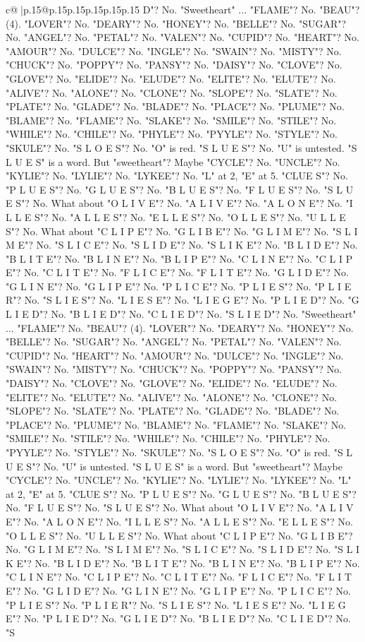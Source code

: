 \documentclass{article}
\begin{document}
{\begin{supertabular}{c@{$\;$}|p{.15\linewidth}@{}p{.15\linewidth}p{.15\linewidth}p{.15\linewidth}p{.15\linewidth}p{.15\linewidth}}
{{{D"? No. "Sweetheart" ... "FLAME"? No. "BEAU"? (4). "LOVER"? No. "DEARY"? No. "HONEY"? No. "BELLE"? No. "SUGAR"? No. "ANGEL"? No. "PETAL"? No. "VALEN"? No. "CUPID"? No. "HEART"? No. "AMOUR"? No. "DULCE"? No. "INGLE"? No. "SWAIN"? No. "MISTY"? No. "CHUCK"? No. "POPPY"? No. "PANSY"? No. "DAISY"? No. "CLOVE"? No. "GLOVE"? No. "ELIDE"? No. "ELUDE"? No. "ELITE"? No. "ELUTE"? No. "ALIVE"? No. "ALONE"? No. "CLONE"? No. "SLOPE"? No. "SLATE"? No. "PLATE"? No. "GLADE"? No. "BLADE"? No. "PLACE"? No. "PLUME"? No. "BLAME"? No. "FLAME"? No. "SLAKE"? No. "SMILE"? No. "STILE"? No. "WHILE"? No. "CHILE"? No. "PHYLE"? No. "PYYLE"? No. "STYLE"? No. "SKULE"? No. "S L O E S"? No. "O" is red. "S L U E S"? No. "U" is untested. "S L U E S" is a word. But "sweetheart"? Maybe "CYCLE"? No. "UNCLE"? No. "KYLIE"? No. "LYLIE"? No. "LYKEE"? No. "L" at 2, "E" at 5. "CLUE S"? No. "P L U E S"? No. "G L U E S"? No. "B L U E S"? No. "F L U E S"? No. "S L U E S"? No. What about "O L I V E"? No. "A L I V E"? No. "A L O N E"? No. "I L L E S"? No. "A L L E S"? No. "E L L E S"? No. "O L L E S"? No. "U L L E S"? No. What about "C L I P E"? No. "G L I B E"? No. "G L I M E"? No. "S L I M E"? No. "S L I C E"? No. "S L I D E"? No. "S L I K E"? No. "B L I D E"? No. "B L I T E"? No. "B L I N E"? No. "B L I P E"? No. "C L I N E"? No. "C L I P E"? No. "C L I T E"? No. "F L I C E"? No. "F L I T E"? No. "G L I D E"? No. "G L I N E"? No. "G L I P E"? No. "P L I C E"? No. "P L I E S"? No. "P L I E R"? No. "S L I E S"? No. "L I E S E"? No. "L I E G E"? No. "P L I E D"? No. "G L I E D"? No. "B L I E D"? No. "C L I E D"? No. "S L I E D"? No. "Sweetheart" ... "FLAME"? No. "BEAU"? (4). "LOVER"? No. "DEARY"? No. "HONEY"? No. "BELLE"? No. "SUGAR"? No. "ANGEL"? No. "PETAL"? No. "VALEN"? No. "CUPID"? No. "HEART"? No. "AMOUR"? No. "DULCE"? No. "INGLE"? No. "SWAIN"? No. "MISTY"? No. "CHUCK"? No. "POPPY"? No. "PANSY"? No. "DAISY"? No. "CLOVE"? No. "GLOVE"? No. "ELIDE"? No. "ELUDE"? No. "ELITE"? No. "ELUTE"? No. "ALIVE"? No. "ALONE"? No. "CLONE"? No. "SLOPE"? No. "SLATE"? No. "PLATE"? No. "GLADE"? No. "BLADE"? No. "PLACE"? No. "PLUME"? No. "BLAME"? No. "FLAME"? No. "SLAKE"? No. "SMILE"? No. "STILE"? No. "WHILE"? No. "CHILE"? No. "PHYLE"? No. "PYYLE"? No. "STYLE"? No. "SKULE"? No. "S L O E S"? No. "O" is red. "S L U E S"? No. "U" is untested. "S L U E S" is a word. But "sweetheart"? Maybe "CYCLE"? No. "UNCLE"? No. "KYLIE"? No. "LYLIE"? No. "LYKEE"? No. "L" at 2, "E" at 5. "CLUE S"? No. "P L U E S"? No. "G L U E S"? No. "B L U E S"? No. "F L U E S"? No. "S L U E S"? No. What about "O L I V E"? No. "A L I V E"? No. "A L O N E"? No. "I L L E S"? No. "A L L E S"? No. "E L L E S"? No. "O L L E S"? No. "U L L E S"? No. What about "C L I P E"? No. "G L I B E"? No. "G L I M E"? No. "S L I M E"? No. "S L I C E"? No. "S L I D E"? No. "S L I K E"? No. "B L I D E"? No. "B L I T E"? No. "B L I N E"? No. "B L I P E"? No. "C L I N E"? No. "C L I P E"? No. "C L I T E"? No. "F L I C E"? No. "F L I T E"? No. "G L I D E"? No. "G L I N E"? No. "G L I P E"? No. "P L I C E"? No. "P L I E S"? No. "P L I E R"? No. "S L I E S"? No. "L I E S E"? No. "L I E G E"? No. "P L I E D"? No. "G L I E D"? No. "B L I E D"? No. "C L I E D"? No. "S }}}
\end{supertabular}}
\end{document}
